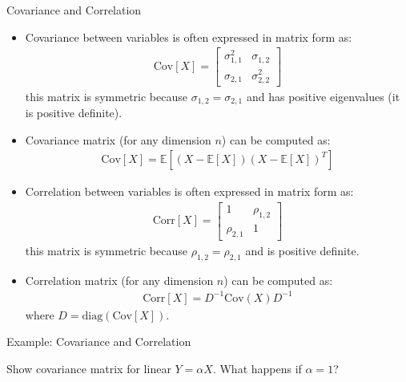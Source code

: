 \documentclass[9pt]{beamer}
\begin{document}
%
\begin{frame}{Covariance and Correlation}

\begin{itemize}
\item Covariance between variables is often expressed in matrix form as: 
\begin{align*}
\textrm{Cov}[X]=\left[\begin{array}{cc}\sigma_{1,1}^2&\sigma_{1,2}\\ \sigma_{2,1}&\sigma_{2,2}^2\end{array}\right]
\end{align*}
this matrix is symmetric because $\sigma_{1,2}=\sigma_{2,1}$ and has positive eigenvalues (it is positive definite).  

\item Covariance matrix (for any dimension $n$) can be computed as:
\begin{align*}
\textrm{Cov}[X]=\mathbb{E}\left[(X-\mathbb{E}[X])(X-\mathbb{E}[X])^T\right]
\end{align*}

\item Correlation between variables is often expressed in matrix form as: 
\begin{align*}
\textrm{Corr}[X]=\left[\begin{array}{cc}1&\rho_{1,2}\\ \rho_{2,1}&1\end{array}\right]
\end{align*}
this matrix is symmetric because $\rho_{1,2}=\rho_{2,1}$ and is positive definite.  

\item Correlation matrix (for any dimension $n$) can be computed as:
\begin{align*}
\textrm{Corr}[X]=D^{-1}\textrm{Cov}(X) D^{-1}
\end{align*}
where $D=\textrm{diag}(\textrm{Cov}[X])$. 
\end{itemize}

\end{frame}

%
\begin{frame}{Example: Covariance and Correlation}

\begin{block}{}
Show covariance matrix for linear $Y=\alpha X$. What happens if $\alpha=1$?
\end{block}

\end{frame}
\end{document}
